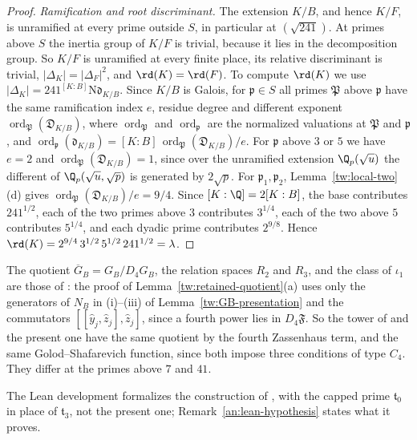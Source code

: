 \begin{proof}
\emph{Ramification and root discriminant.} The extension $K/B$, and hence
$K/F$, is unramified at every prime outside $S$, in particular at
$(\sqrt{241})$. At primes above $S$ the inertia group of $K/F$ is trivial,
because it lies in the decomposition group. So $K/F$ is unramified at every
finite place, its relative discriminant is trivial, $|\Delta_K|=|\Delta_F|^2$,
and $\rd(K)=\rd(F)$. To compute $\rd(K)$ we use
$|\Delta_K|=241^{[K:B]}\mathrm N\mathfrak d_{K/B}$. Since $K/B$ is Galois, for
$\mathfrak p\in S$ all primes $\mathfrak P$ above $\mathfrak p$ have the same
ramification index $e$, residue degree and different exponent
$\operatorname{ord}_{\mathfrak P}(\mathfrak D_{K/B})$, where
$\operatorname{ord}_{\mathfrak P}$ and $\operatorname{ord}_{\mathfrak p}$ are
the normalized valuations at $\mathfrak P$ and $\mathfrak p$, and
$\operatorname{ord}_{\mathfrak p}(\mathfrak d_{K/B})=[K:B]\,\operatorname{ord}_{\mathfrak P}(\mathfrak D_{K/B})/e$.
For $\mathfrak p$ above $3$ or $5$ we have $e=2$ and
$\operatorname{ord}_{\mathfrak P}(\mathfrak D_{K/B})=1$, since over the unramified extension
$\Q_p(\sqrt u)$ the different of $\Q_p(\sqrt u,\sqrt p)$ is generated by
$2\sqrt p$. For $\mathfrak p_1,\mathfrak p_2$, Lemma~\ref{tw:local-two}(d)
gives $\operatorname{ord}_{\mathfrak P}(\mathfrak D_{K/B})/e=9/4$. Since $[K:\Q]=2[K:B]$, the
base contributes $241^{1/2}$, each of the two primes above $3$ contributes
$3^{1/4}$, each of the two above $5$ contributes $5^{1/4}$, and each dyadic
prime contributes $2^{9/8}$. Hence
$\rd(K)=2^{9/4}\,3^{1/2}\,5^{1/2}\,241^{1/2}=\lambda$.
\end{proof}

\begin{remark}\label{tw:same-quotient}
The quotient $\overline G_B=G_B/D_4G_B$, the relation spaces $R_2$ and $R_3$,
and the class of $\iota_1$ are those of \cite{Naslund04273}: the proof of
Lemma~\ref{tw:retained-quotient}(a) uses only the generators of $N_B$ in
(i)--(iii) of Lemma~\ref{tw:GB-presentation} and the commutators
$[[\hat y_j,\hat z_j],\hat z_j]$, since a fourth power lies in $D_4\mathfrak F$.
So the tower of \cite{Naslund04273} and the present one have the same quotient
by the fourth Zassenhaus term, and the same Golod--Shafarevich function, since
both impose three conditions of type $C_4$. They differ at the primes above
$7$ and $41$.
\end{remark}

\begin{remark}\label{tw:lean-remark}
The Lean development \cite{NaslundLean2026} formalizes the construction of
\cite{Naslund04273}, with the capped prime $\mathfrak t_0$ in place of
$\mathfrak t_3$, not the present one; Remark~\ref{an:lean-hypothesis} states
what it proves.
\end{remark}
